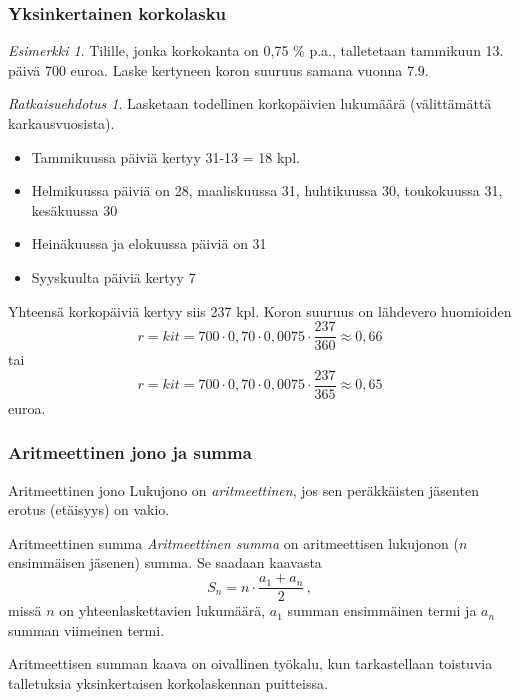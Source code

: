 \documentclass[]{beamer}\usepackage[]{graphicx}\usepackage[]{color}
\theoremstyle{remark}
\newtheorem{esim}{Esimerkki}
\newtheorem{ratkaisu}{Ratkaisuehdotus}
\begin{document}
\begin{frame}
    \frametitle{Yksinkertainen korkolasku}
    \begin{esim}
        Tilille, jonka korkokanta on 0,75 \% p.a., talletetaan tammikuun 13. päivä 700 euroa. \pause
        Laske kertyneen koron suuruus samana vuonna 7.9. 
    \end{esim}
\end{frame}

\begin{frame}
    \begin{ratkaisu}
      Lasketaan todellinen korkopäivien lukumäärä (välittämättä karkausvuosista).
      \begin{itemize}
          \item Tammikuussa päiviä kertyy 31-13 = 18 kpl.
          \item Helmikuussa päiviä on 28, maaliskuussa 31, huhtikuussa 30, toukokuussa 31, kesäkuussa 30
          \item Heinäkuussa ja elokuussa päiviä on 31
          \item Syyskuulta päiviä kertyy 7
      \end{itemize}
      \pause Yhteensä korkopäiviä kertyy siis 237 kpl. \pause Koron suuruus on lähdevero huomioiden
      \[
          r = kit = 700\cdot 0,70\cdot0,0075\cdot\frac{237}{360} \approx 0{,}66
      \]
      tai
      \[
          r = kit = 700\cdot 0,70\cdot0,0075\cdot\frac{237}{365} \approx 0{,}65
      \]
      euroa.
    \end{ratkaisu}
\end{frame}

\begin{frame}
    \frametitle{Aritmeettinen jono ja summa}
    \begin{block}{Aritmeettinen jono}
        Lukujono \pause on \emph{aritmeettinen}, jos sen peräkkäisten jäsenten erotus (etäisyys) on vakio.
    \end{block}
    \pause
    \begin{block}{Aritmeettinen summa}
        \emph{Aritmeettinen summa} \pause on aritmeettisen lukujonon ($n$ ensimmäisen jäsenen) summa. \pause Se saadaan kaavasta
        \[
            S_n = n \cdot \frac{a_1 + a_n}{2}\,,
        \]
        \pause missä $n$ on yhteenlaskettavien lukumäärä, \pause $a_1$ summan ensimmäinen termi ja \pause $a_n$ summan viimeinen termi.
    \end{block}
    \pause
    Aritmeettisen summan kaava on oivallinen työkalu, kun tarkastellaan toistuvia talletuksia yksinkertaisen korkolaskennan puitteissa.
\end{frame}
\end{document}
